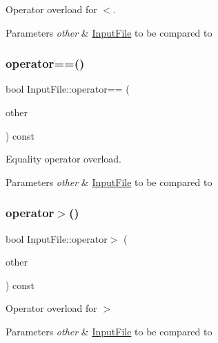 Operator overload for $<$. 


\begin{DoxyParams}{Parameters}
{\em other} & \hyperlink{class_input_file}{Input\+File} to be compared to \\
\hline
\end{DoxyParams}
\mbox{\label{class_input_file_aba80d895922ad25de1bdd7724d35755a}} 
\subsubsection{\texorpdfstring{operator==()}{operator==()}}
{\footnotesize\ttfamily bool Input\+File\+::operator== (\begin{DoxyParamCaption}\item[{const \hyperlink{class_input_file}{Input\+File} \&}]{other }\end{DoxyParamCaption}) const}



Equality operator overload. 


\begin{DoxyParams}{Parameters}
{\em other} & \hyperlink{class_input_file}{Input\+File} to be compared to \\
\hline
\end{DoxyParams}
\mbox{\label{class_input_file_a4bf7efae68f3f378d1d4d1565fce8081}} 
\subsubsection{\texorpdfstring{operator$>$()}{operator>()}}
{\footnotesize\ttfamily bool Input\+File\+::operator$>$ (\begin{DoxyParamCaption}\item[{const \hyperlink{class_input_file}{Input\+File} \&}]{other }\end{DoxyParamCaption}) const}



Operator overload for $>$ 


\begin{DoxyParams}{Parameters}
{\em other} & \hyperlink{class_input_file}{Input\+File} to be compared to \\
\hline
\end{DoxyParams}
\mbox{\label{class_input_file_a7a27c978d7aebf861360c642ddb47ef5}} 
